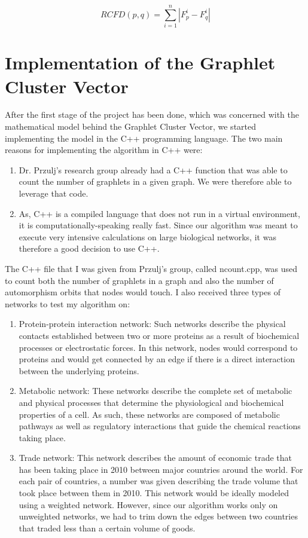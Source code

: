 \begin{equation}
 RCFD(p,q) = \sum_{i=1}^{n}| F_p^i - F_q^i |
\end{equation}

\section{Implementation of the Graphlet Cluster Vector}

After the first stage of the project has been done, which was concerned with
the mathematical model behind the Graphlet Cluster Vector, we started
implementing the model in the C++ programming language. The two main reasons for
implementing the algorithm in C++ were:
\begin{enumerate}
 \item Dr. Przulj's research group already had a C++ function that was able to
count the number of graphlets in a given graph. We were therefore able to
leverage that code.
 \item As, C++ is a compiled language that does not run in a virtual
environment, it is computationally-speaking really fast. Since our algorithm
was meant to execute very intensive calculations on large biological networks,
it was therefore a good decision to use C++. 
\end{enumerate}

The C++ file that I was given from Przulj's group, called ncount.cpp, was used
to count both the number of graphlets in a graph and also the number of
automorphism orbits that nodes would touch. I also received three types of
networks to test my algorithm on:
\begin{enumerate}
  \item Protein-protein interaction network: Such networks describe the physical
contacts established between two or more proteins as a result of biochemical
processes or electrostatic forces. In this network, nodes would correspond to
proteins and would get connected by an edge if there is a direct interaction
between the underlying proteins. 
  \item Metabolic network:  These networks describe the complete set of
metabolic and physical processes that determine the physiological and
biochemical properties of a cell. As such, these networks are composed of
metabolic pathways as well as regulatory interactions that guide the chemical
reactions taking place.
  \item Trade network: This network describes the amount of economic trade
that has been taking place in 2010 between major countries around the world.
For each pair of countries, a number was given describing the trade volume that
took place between them in 2010. This network would be ideally modeled using a
weighted network. However, since our algorithm works only on unweighted
networks, we had to trim down the edges between two countries that traded less
than a certain volume of goods. 
\end{enumerate}

